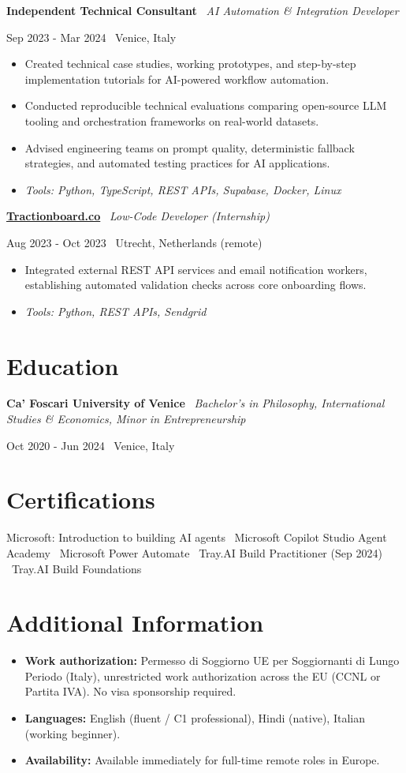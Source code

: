 \documentclass[a4paper,10pt]{article}
\newcommand{\role}[4]{%
  \vspace{2pt}\noindent
  \begin{minipage}[t]{0.70\textwidth}\raggedright\textbf{#1} \textbullet\ \textit{#3}\end{minipage}%
  \hfill
  \begin{minipage}[t]{0.28\textwidth}\raggedleft\footnotesize\color{gray}#2 \textbullet\ #4\end{minipage}%
  \vspace{1pt}%
}
\begin{document}
\role{Independent Technical Consultant}{Sep 2023 - Mar 2024}{AI Automation \& Integration Developer}{Venice, Italy}
\begin{itemize}
  \item Created technical case studies, working prototypes, and step-by-step implementation tutorials for AI-powered workflow automation.
  \item Conducted reproducible technical evaluations comparing open-source LLM tooling and orchestration frameworks on real-world datasets.
  \item Advised engineering teams on prompt quality, deterministic fallback strategies, and automated testing practices for AI applications.
  \item \textit{Tools: Python, TypeScript, REST APIs, Supabase, Docker, Linux}
\end{itemize}

\role{\href{https://tractionboard.co}{Tractionboard.co}}{Aug 2023 - Oct 2023}{Low-Code Developer (Internship)}{Utrecht, Netherlands (remote)}
\begin{itemize}
  \item Integrated external REST API services and email notification workers, establishing automated validation checks across core onboarding flows.
  \item \textit{Tools: Python, REST APIs, Sendgrid}
\end{itemize}

\section{Education}
\role{Ca' Foscari University of Venice}{Oct 2020 - Jun 2024}{Bachelor's in Philosophy, International Studies \& Economics, Minor in Entrepreneurship}{Venice, Italy}

\section{Certifications}
Microsoft: Introduction to building AI agents \textbullet\ Microsoft Copilot Studio Agent Academy \textbullet\ Microsoft Power Automate \textbullet\ Tray.AI Build Practitioner (Sep 2024) \textbullet\ Tray.AI Build Foundations

\section{Additional Information}
\begin{itemize}
  \item \textbf{Work authorization:} Permesso di Soggiorno UE per Soggiornanti di Lungo Periodo (Italy), unrestricted work authorization across the EU (CCNL or Partita IVA). No visa sponsorship required.
  \item \textbf{Languages:} English (fluent / C1 professional), Hindi (native), Italian (working beginner).
  \item \textbf{Availability:} Available immediately for full-time remote roles in Europe.
\end{itemize}
\end{document}
